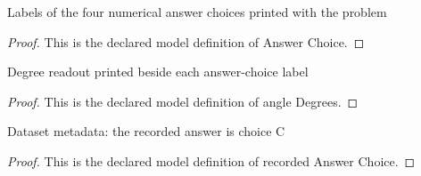 \begin{definition}
  \label{def:physics:phyx-mini-0069:phyxminiproblems-problemphyxmini0069-answerchoice}
  Labels of the four numerical answer choices printed with the problem
\end{definition}
\begin{proof}
  This is the declared model definition of Answer Choice.
\end{proof}
\begin{definition}
  \label{def:physics:phyx-mini-0069:phyxminiproblems-problemphyxmini0069-answerchoice-angledegrees}
  Degree readout printed beside each answer-choice label
\end{definition}
\begin{proof}
  This is the declared model definition of angle Degrees.
\end{proof}
\begin{definition}
  \label{def:physics:phyx-mini-0069:phyxminiproblems-problemphyxmini0069-recordedanswerchoice}
  Dataset metadata: the recorded answer is choice C
\end{definition}
\begin{proof}
  This is the declared model definition of recorded Answer Choice.
\end{proof}
